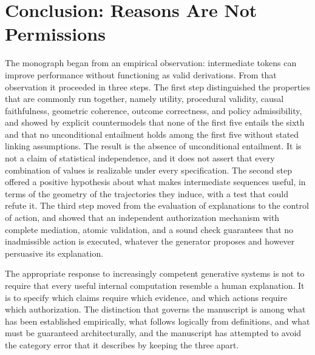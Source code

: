 \chapter{Conclusion: Reasons Are Not Permissions}
\label{ch:conclusion}

The monograph began from an empirical observation: intermediate tokens can improve performance without functioning as valid derivations. From that observation it proceeded in three steps. The first step distinguished the properties that are commonly run together, namely utility, procedural validity, causal faithfulness, geometric coherence, outcome correctness, and policy admissibility, and showed by explicit countermodels that none of the first five entails the sixth and that no unconditional entailment holds among the first five without stated linking assumptions. The result is the absence of unconditional entailment. It is not a claim of statistical independence, and it does not assert that every combination of values is realizable under every specification. The second step offered a positive hypothesis about what makes intermediate sequences useful, in terms of the geometry of the trajectories they induce, with a test that could refute it. The third step moved from the evaluation of explanations to the control of action, and showed that an independent authorization mechanism with complete mediation, atomic validation, and a sound check guarantees that no inadmissible action is executed, whatever the generator proposes and however persuasive its explanation.

The appropriate response to increasingly competent generative systems is not to require that every useful internal computation resemble a human explanation. It is to specify which claims require which evidence, and which actions require which authorization. The distinction that governs the manuscript is among what has been established empirically, what follows logically from definitions, and what must be guaranteed architecturally, and the manuscript has attempted to avoid the category error that it describes by keeping the three apart.

